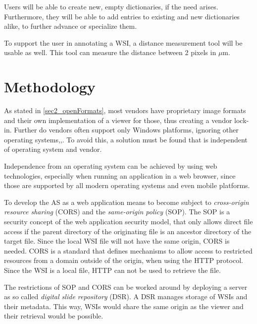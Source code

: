 Users will be able to create new, empty dictionaries, if the need arises. Furthermore, they will be able to add entries to existing and new dictionaries alike, to further advance or specialize them.

To support the user in annotating a WSI, a distance measurement tool will be usable as well. This tool can measure the distance between 2 pixels in $\mu$m.


\section{Methodology}
\label{sec4_methodology}
As stated in \ref{sec2_openFormats}, most vendors have proprietary image formats and their own implementation of a viewer for those, thus creating a vendor lock-in. Further do vendors often support only Windows platforms, ignoring other operating systems\cite{Cornish13},\cite{DICOM10},\cite{Farahanil15}. To avoid this, a solution must be found that is independent of operating system and vendor.

Independence from an operating system can be achieved by using web technologies, especially when running an application in a web browser, since those are supported by all modern operating systems and even mobile platforms\cite{Tseytlin14}.

To develop the AS as a web application means to become subject to \emph{cross-origin resource sharing} (CORS)\cite{Kesteren14} and the \emph{same-origin policy} (SOP)\cite{web:mdn}. The SOP is a security concept of the web application security model, that only allows direct file access if the parent directory of the originating file is an ancestor directory of the target file\cite{web:mdn}. Since the local WSI file will not have the same origin, CORS is needed. CORS is a standard that defines mechanisms to allow access to restricted resources from a domain outside of the origin, when using the HTTP protocol\cite{Kesteren14}. Since the WSI is a local file, HTTP can not be used to retrieve the file.

The restrictions of SOP and CORS can be worked around by deploying a server as so called \emph{digital slide repository} (DSR). A DSR manages storage of WSIs and their metadata\cite{Cornish13}. This way, WSIs would share the same origin as the viewer and their retrieval would be possible.

